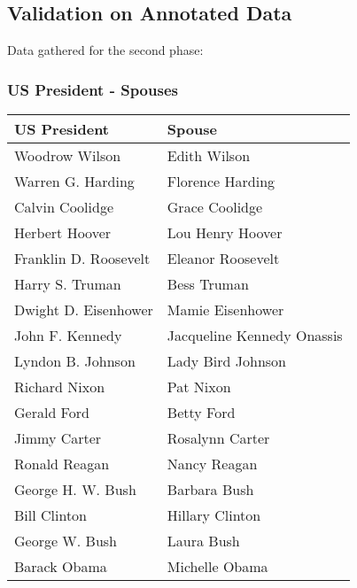 \documentclass[10pt,11pt,12pt,oneside]{book}
\begin{document}
\begin{appendices}
\newpage
\section{Validation on Annotated Data}
Data gathered for the second phase:
\subsubsection{US President - Spouses}
\begin{table}[H]
	\begin{center}
		\begin{tabular}{|p{2in}|p{2in}|} \hline 
			US President & Spouse \\ \hline 
			Woodrow Wilson & Edith Wilson \\ \hline 
			Warren G. Harding & Florence Harding \\ \hline 
			Calvin Coolidge & Grace Coolidge \\ \hline 
			Herbert Hoover & Lou Henry Hoover \\ \hline 
			Franklin D. Roosevelt & Eleanor Roosevelt \\ \hline 
			Harry S. Truman & Bess Truman \\ \hline 
			Dwight D. Eisenhower & Mamie Eisenhower \\ \hline 
			John F. Kennedy & Jacqueline Kennedy Onassis \\ \hline 
			Lyndon B. Johnson & Lady Bird Johnson \\ \hline 
			Richard Nixon & Pat Nixon \\ \hline 
			Gerald Ford & Betty Ford \\ \hline 
			Jimmy Carter & Rosalynn Carter \\ \hline 
			Ronald Reagan & Nancy Reagan \\ \hline 
			George H. W. Bush & Barbara Bush \\ \hline 
			Bill Clinton & Hillary Clinton \\ \hline 
			George W. Bush & Laura Bush \\ \hline 
			Barack Obama & Michelle Obama \\ \hline 
		\end{tabular}
	\end{center}
\end{table}


\end{appendices}
\end{document}

